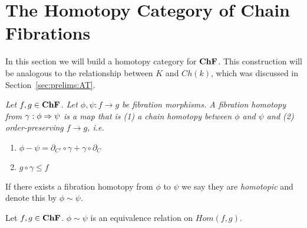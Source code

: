 
\section{The Homotopy Category of Chain Fibrations}\label{sec:homotopy}


  In this section we will build a homotopy category for ${\bf ChF}$.  This construction will be analogous to the relationship between $K$ and $Ch(k)$, which was discussed in Section~\ref{sec:prelims:AT}.

\begin{defn}
{\em
Let $f,g\in {\bf ChF}$.  Let $\phi,\psi:f\to g$ be fibration morphisms.  A {\em fibration homotopy} from $\gamma:\phi\Rightarrow \psi$ is a map that is (1) a chain homotopy between $\phi$ and $\psi$ and (2) order-preserving $f\to g$, i.e.
\begin{enumerate}
\item $\phi - \psi = \partial_{C'}\circ \gamma + \gamma\circ \partial_C$
\item $g\circ \gamma \leq f$
\end{enumerate}
}
\end{defn}




If there exists a fibration homotopy from $\phi$ to $\psi$ we say they are {\em homotopic} and denote this by $\phi\sim \psi$.  

\begin{prop}
 Let $f,g\in {\bf ChF}$.  $\phi \sim \psi$ is an equivalence relation on $Hom(f,g)$.
\end{prop}
%
%
%
%
%
%


